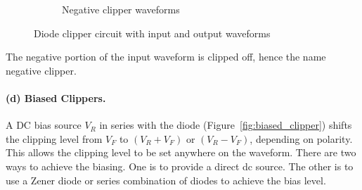 \begin{figure}[htbp]
\begin{subfigure}{0.52\textwidth}
		\caption{Negative clipper waveforms}
		\label{fig:waveNegClipper}	
	\end{subfigure}
	\caption{Diode clipper circuit with input and output waveforms}
	\label{fig:negClipper-full}
\end{figure}
The negative portion of the input waveform is clipped off, hence the name negative clipper.
\paragraph{(d) Biased Clippers.}
A DC bias source $V_R$ in series with the diode (Figure~\ref{fig:biased_clipper}) shifts the clipping level from $V_F$ to $(V_R + V_F)$ or $(V_R - V_F)$, depending on polarity. This allows the clipping level to be set anywhere on the waveform. There are two ways to achieve the biasing. One is to provide a direct dc source. The other is to use a Zener diode or series combination of diodes to achieve the bias level.

